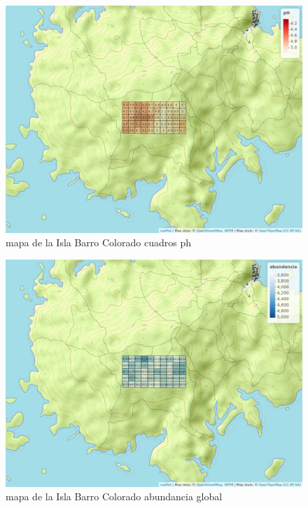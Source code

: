 \documentclass[11pt,]{article}
\begin{document}
\begin{figure}
\centering
\includegraphics[width=1.00000\textwidth]{mapa_cuadros_ph.png}
\caption{mapa de la Isla Barro Colorado cuadros ph\label{fig:bci_map}}
\end{figure}

\begin{figure}
\centering
\includegraphics[width=1.00000\textwidth]{mapa_cuadros_abun_global.png}
\caption{mapa de la Isla Barro Colorado abundancia global
\label{fig:bci_map}}
\end{figure}
\end{document}
